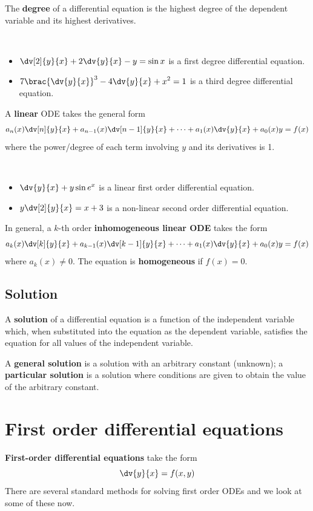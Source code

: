 The \textbf{degree} of a differential equation is the highest degree of the dependent variable and its highest derivatives.
\begin{example} \
\begin{itemize}
\item $\displaystyle\dv[2]{y}{x}+2\dv{y}{x}-y=\sin x$ is a first degree differential equation.
\item $\displaystyle7\brac{\dv{y}{x}}^3-4\dv{y}{x}+x^2=1$ is a third degree differential equation.
\end{itemize}
\end{example}

A \textbf{linear} ODE takes the general form
\[ a_n(x)\dv[n]{y}{x}+a_{n-1}(x)\dv[n-1]{y}{x}+\cdots+a_1(x)\dv{y}{x}+a_0(x)y=f(x) \]
where the power/degree of each term involving $y$ and its derivatives is 1.
\begin{example} \
\begin{itemize}
\item $\displaystyle\dv{y}{x}+y\sin e^x$ is a linear first order differential equation.
\item $\displaystyle y\dv[2]{y}{x}=x+3$ is a non-linear second order differential equation.
\end{itemize}
\end{example}

In general, a $k$-th order \textbf{inhomogeneous linear ODE} takes the form
\[ a_k(x)\dv[k]{y}{x} + a_{k-1}(x)\dv[k-1]{y}{x} + \cdots + a_1(x)\dv{y}{x} + a_0(x)y = f(x) \]
where $a_k(x) \neq 0$. The equation is \textbf{homogeneous} if $f(x) = 0$. 

\subsection{Solution}
A \textbf{solution} of a differential equation is a function of the independent variable which, when substituted into the equation as the dependent variable, satisfies the equation for all values of the independent variable.

A \textbf{general solution} is a solution with an arbitrary constant (unknown); a \textbf{particular solution} is a solution where conditions are given to obtain the value of the arbitrary constant.
\pagebreak

\section{First order differential equations}
\textbf{First-order differential equations} take the form
\[ \dv{y}{x} = f(x,y) \]
There are several standard methods for solving first order ODEs and we look at some of these now.

